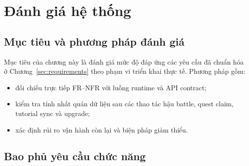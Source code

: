 \section{Đánh giá hệ thống}
\label{sec:evaluation}

\subsection{Mục tiêu và phương pháp đánh giá}
\label{subsec:eval-method}

Mục tiêu của chương này là đánh giá mức độ đáp ứng các yêu cầu đã chuẩn hóa ở Chương~\ref{sec:requirements} theo phạm vi triển khai thực tế. Phương pháp gồm:
\begin{itemize}
    \item đối chiếu trực tiếp FR--NFR với luồng runtime và API contract;
    \item kiểm tra tính nhất quán dữ liệu sau các thao tác hậu battle, quest claim, tutorial sync và upgrade;
    \item xác định rủi ro vận hành còn lại và biện pháp giảm thiểu.
\end{itemize}

\subsection{Bao phủ yêu cầu chức năng}
\label{subsec:eval-functional}

